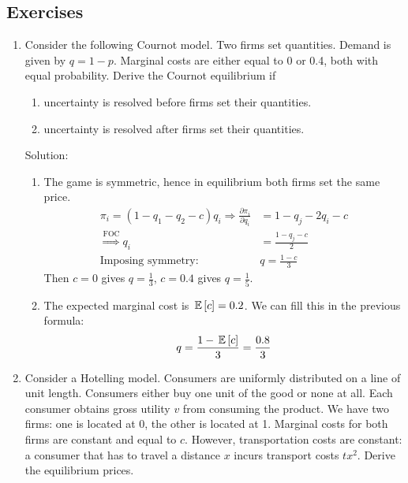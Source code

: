 \subsection{Exercises}
\begin{enumerate}
	\item Consider the following Cournot model. Two firms set quantities. Demand is given by
	      $q=1-p$. Marginal costs are either equal to 0 or 0.4, both with equal probability.
	      Derive the Cournot equilibrium if
	      \begin{enumerate}
		      \item uncertainty is resolved before firms set their quantities.
		      \item uncertainty is resolved after firms set their quantities.
	      \end{enumerate}

	      Solution:
	      \begin{enumerate}
		      \item The game is symmetric, hence in equilibrium both firms set the same
		            price.
		            \begin{align*}
			            \pi_i=(1-q_1-q_2-c)q_i\Longrightarrow\frac{\partial\pi_i}{\partial q_i} & =1-q_j-2q_i-c      \\
			            \overset{\text{FOC}}{\Longrightarrow} q_i                               & =\frac{1-q_j-c}{2} \\
			            \text{Imposing symmetry: }                                              & q=\frac{1-c}{3}
		            \end{align*}
		            Then $c=0$ gives $q=\frac{1}{3}$, $c=0.4$ gives $q=\frac{1}{5}$.
		      \item The expected marginal cost is $\,\mathbb{E}\left[c\right]=0.2$. We can fill this in
		            the previous formula:
		            \begin{align*}
			            q=\frac{1-\,\mathbb{E}\left[c\right]}{3}=\frac{0.8}{3}
		            \end{align*}
	      \end{enumerate}
	\item Consider a Hotelling model. Consumers are uniformly distributed on a line of unit
	      length. Consumers either buy one unit of the good or none at all. Each consumer
	      obtains gross utility $v$ from consuming the product. We have two firms: one is
	      located at 0, the other is located at 1. Marginal costs for both firms are constant
	      and equal to $c$. However, transportation costs are constant: a consumer that has
	      to travel a distance $x$ incurs transport costs $tx^2$. Derive the equilibrium prices.


\end{enumerate}
